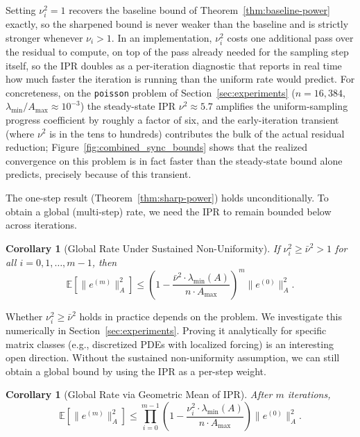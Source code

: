 \documentclass[pdflatex,sn-mathphys-num]{sn-jnl}%
\newcommand{\E}{\mathbb{E}}
\newcommand{\Anorm}[1]{\|#1\|_{A}}
\newcommand{\lmin}{\lambda_{\min}}
\theoremstyle{thmstyleone}%
\newtheorem{corollary}[theorem]{Corollary}
\theoremstyle{thmstyletwo}%
\theoremstyle{thmstylethree}%
\begin{document}
Setting $\nu_i^2 = 1$ recovers the baseline bound of
Theorem~\ref{thm:baseline-power} exactly, so the sharpened bound is
never weaker than the baseline and is strictly stronger whenever
$\nu_i > 1$. In an implementation, $\nu_i^2$ costs one additional pass
over the residual to compute, on top of the pass already needed for
the sampling step itself, so the IPR doubles as a per-iteration
diagnostic that reports in real time how much faster the iteration is
running than the uniform rate would predict. For concreteness, on the
\texttt{poisson} problem of Section~\ref{sec:experiments}
($n = 16{,}384$, $\lambda_{\min}/A_{\max} \approx 10^{-3}$) the
steady-state IPR $\nu^2 \approx 5.7$ amplifies the uniform-sampling
progress coefficient by roughly a factor of six, and the
early-iteration transient (where $\nu^2$ is in the tens to hundreds)
contributes the bulk of the actual residual reduction;
Figure~\ref{fig:combined_sync_bounds} shows that the realized
convergence on this problem is in fact faster than the steady-state
bound alone predicts, precisely because of this transient.



The one-step result (Theorem~\ref{thm:sharp-power}) holds unconditionally. To obtain a global (multi-step) rate, we need the IPR to remain bounded below across iterations.

\begin{corollary}[Global Rate Under Sustained Non-Uniformity]
\label{cor:global-rate}
If $\nu_i^2 \geq \bar{\nu}^2 > 1$ for all $i = 0, 1, \ldots, m-1$, then
$$
\E[\Anorm{e^{(m)}}^2] \leq \left(1 - \frac{\bar{\nu}^2 \cdot \lmin(A)}{n \cdot A_{\max}}\right)^m \Anorm{e^{(0)}}^2.
$$
\end{corollary}

Whether $\nu_i^2 \geq \bar{\nu}^2$ holds in practice depends on the problem. We investigate this numerically in Section~\ref{sec:experiments}. Proving it analytically for specific matrix classes (e.g., discretized PDEs with localized forcing) is an interesting open direction.
Without the sustained non-uniformity assumption, we can still obtain a global bound by using the IPR as a per-step weight.

\begin{corollary}[Global Rate via Geometric Mean of IPR]
\label{cor:geometric-mean}
After $m$ iterations,
$$
\E[\Anorm{e^{(m)}}^2] \leq \prod_{i=0}^{m-1}\left(1 - \frac{\nu_i^2 \cdot \lmin(A)}{n \cdot A_{\max}}\right) \Anorm{e^{(0)}}^2.
$$
\end{corollary}
\end{document}

